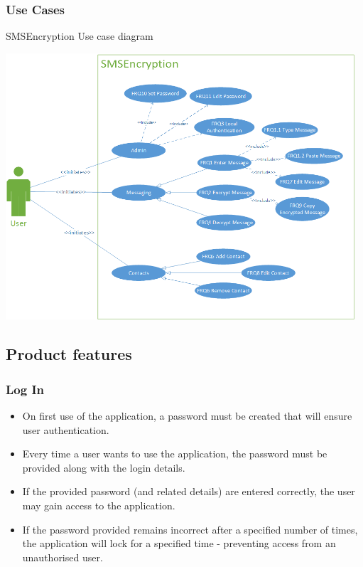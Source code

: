 \newpage
\subsubsection{Use Cases}
SMSEncryption Use case diagram

\begin{center}
 \includegraphics[width=13cm]{diagrams/UseCaseDiagrams/UsecaseV2.png}
\end{center}




\subsection{Product features}
\subsubsection{Log In}
\begin{itemize}
\item On first use of the application, a password must be created that will ensure user authentication.
\item Every time a user wants to use the application, the password must be provided along with the login details.
\item If the provided password (and related details) are entered correctly, the user may gain access to the application.
\item If the password provided remains incorrect after a specified number of times, the application will lock for a specified time - preventing access from an unauthorised user.
\end{itemize}
